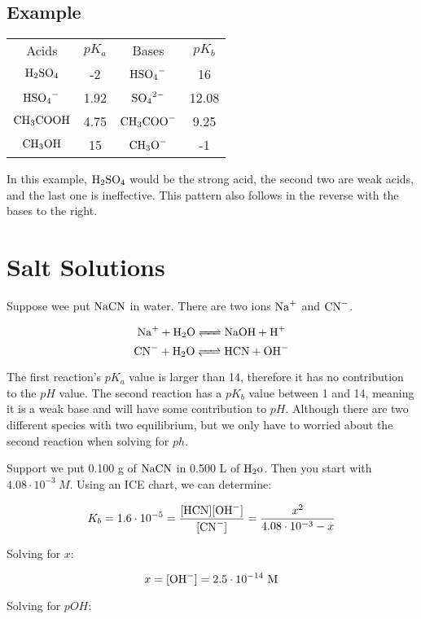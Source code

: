 \documentclass{article}
\begin{document}
\subsection{Example} 
\begin{center} 
        \begin{tabular} {c c c c} 
                Acids  & $pK_a$ & Bases & $pK_b$\\ 
                $\ce{H_2SO_4}$ & -2 & $\ce{HSO_4-}$ & 16\\ 
                $\ce{HSO_4-}$ & 1.92 & $\ce{SO_4^{2-}}$ & 12.08\\ 
                $\ce{CH_3COOH}$ & 4.75 & $\ce{CH_3COO-}$ & 9.25\\ 
                $\ce{CH_3OH}$ & 15 & $\ce{CH_3O-}$ & -1\\ 
         \end{tabular} 
 \end{center}

In this example, $\ce{H_2SO_4}$ would be the strong acid, the second two are
weak acids, and the last one is ineffective. This pattern also follows in the reverse
with the bases to the right.

\section{Salt Solutions}

Suppose wee put $\ce{NaCN}$ in water. There are two ions $\ce{Na+}$ and $\ce{CN-}$.

$$\ce{Na+ + H_2O <=> NaOH + H+}$$
$$\ce{CN- + H_2O <=> HCN + OH-}$$

The first reaction's  $pK_a$ value is larger than 14, therefore it has no
contribution to the $pH$ value. The second reaction has a $pK_b$ value between
1 and 14, meaning it is a weak base and will have some contribution to $pH$.
Although there are two different species with two equilibrium, but we only have
to worried about the second reaction when solving for $ph$.

Support we put 0.100 \si{g} of $\ce{NaCN}$ in 0.500 \si{L} of $\ce{H_2o}$. Then
you start with $4.08\cdot10^{-3}\ \si{M}$. Using an ICE chart, we can determine:

$$K_b=1.6\cdot10^{-5}=\frac{[\ce{HCN}][\ce{OH-}]}{[\ce{CN-}]}=\frac{x^2}{4.08\cdot10^{-3}-x}$$

Solving for $x$:

$$x=[\ce{OH-}]=2.5\cdot10^{-14}\ \si{M}$$

Solving for $pOH$:
\end{document}
